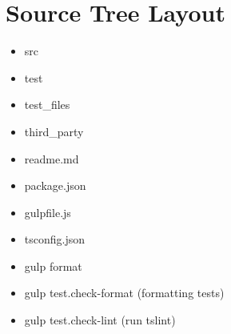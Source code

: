 \section{Source Tree Layout}


\begin{itemize}
  \item src
  \item test
  \item test\_files
  \item third\_party
\end{itemize}


\begin{itemize}
  \item readme.md
  \item package.json
  \item gulpfile.js
  \item tsconfig.json
\end{itemize}








\begin{itemize}
  \item gulp format
  \item gulp test.check-format (formatting tests)
  \item gulp test.check-lint (run tslint)
\end{itemize}

